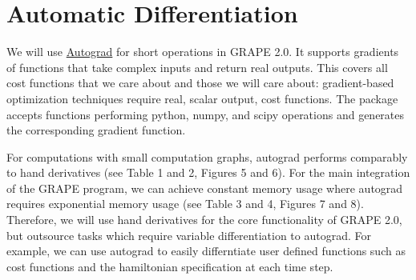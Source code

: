 \documentclass[letterpaper, 12pt]{article}
\begin{document}
\section{Automatic Differentiation}
We will use \href{https://github.com/HIPS/autograd}{Autograd} \cite{maclaurin2016modeling} for short operations in GRAPE 2.0. It supports gradients of functions that take complex inputs and return real outputs. This covers all cost functions that we care about and those we will care about: gradient-based optimization techniques require real, scalar output, cost functions. The package accepts functions performing python, numpy, and scipy operations and generates the corresponding gradient function.

For computations with small computation graphs, autograd performs comparably to hand derivatives (see Table 1 and 2, Figures 5 and 6). For the main integration of the GRAPE program, we can achieve constant memory usage where autograd requires exponential memory usage (see Table 3 and 4, Figures 7 and 8). Therefore, we will use hand derivatives for the core functionality of GRAPE 2.0, but outsource tasks which require variable differentiation to autograd. For example, we can use autograd to easily differntiate user defined functions such as cost functions and the hamiltonian specification at each time step.
\end{document}
